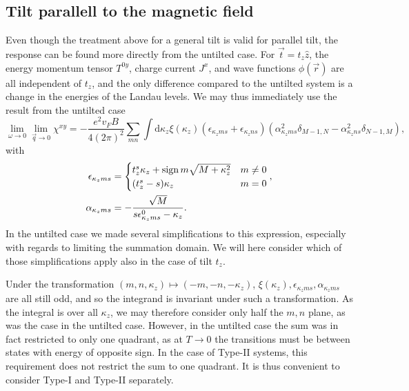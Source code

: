 \subsection{Tilt parallell to the magnetic field}
Even though the treatment above for a general tilt is valid for parallel tilt, the response can be found more directly from the untilted case.
For \( \vec{t} = t_z \hat{z} \), the energy momentum tensor \( T^{0y} \), charge current \( J^x \), and wave functions \( \phi(\vec{r}) \) are all independent of \( t_z \), and the only difference compared to the untilted system is a change in the energies of the Landau levels.
We may thus immediately use the result from the untilted case
\begin{equation}
  \label{eq:129}
  \lim_{\omega \to 0} \lim_{\vec{q} \to 0} \chi^{xy} =
  - \frac{e^2 v_F B}{4(2\pi)^2}
  \sum\limits_{mn} \int \mathrm{d} \kappa_z
  \xi(\kappa_z)
  (\epsilon_{\kappa_z m s} + \epsilon_{\kappa_z n s})
  (\alpha_{\kappa_z m s}^2 \delta_{M-1, N} - \alpha_{\kappa_z n s}^2 \delta_{N-1, M}),
\end{equation}
with
\begin{align}
  \label{eq:95}
  \epsilon_{\kappa_z m s} &=
                          \begin{cases}
                            t_z^s \kappa_z + \operatorname{sign}{m} \sqrt{M + \kappa_z^2} & m \neq 0\\
                            (t_z^s - s) \kappa_z & m = 0
                          \end{cases},\\
  \alpha_{\kappa_z m s} &=
                         -\frac{\sqrt{M}}{s \epsilon_{\kappa_z  m s}^0 - \kappa_z }.
\end{align}
In the untilted case we made several simplifications to this expression, especially with regards to limiting the summation domain.
We will here consider which of those simplifications apply also in the case of tilt \( t_z \).

Under the transformation \( (m,n,\kappa_z) \mapsto (-m, -n , -\kappa_z) \), \( \xi(\kappa_z), \epsilon_{\kappa_z m s}, \alpha_{\kappa_z m s} \) are all still odd, and so the integrand is invariant under such a transformation.
As the integral is over all \( \kappa_z \), we may therefore consider only half the \( m,n \) plane, as was the case in the untilted case.
However, in the untilted case the sum was in fact restricted to only one quadrant, as at \( T\to 0 \) the transitions must be between states with energy of opposite sign.
In the case of Type-II systems, this requirement does not restrict the sum to one quadrant.
It is thus convenient to consider Type-I and Type-II separately.

